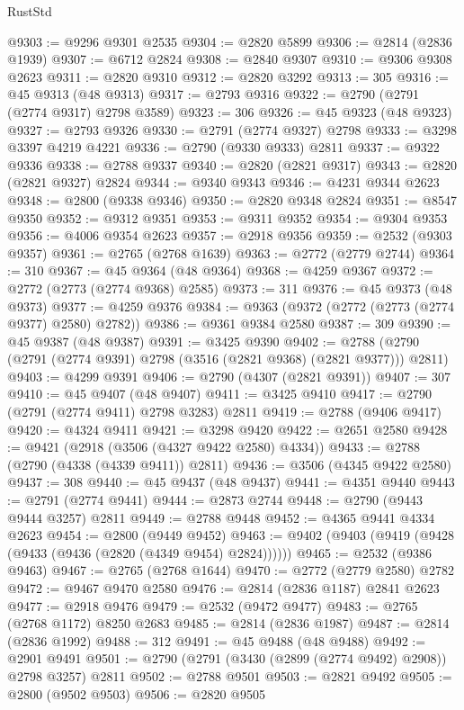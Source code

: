 \begin{lexlean}{RustStd}
\begin{coremodule}
@9303 := @9296 @9301 @2535
@9304 := @2820 @5899
@9306 := @2814 (@2836 @1939)
@9307 := @6712 @2824
@9308 := @2840 @9307
@9310 := @9306 @9308 @2623
@9311 := @2820 @9310
@9312 := @2820 @3292
@9313 := 305
@9316 := @45 @9313 (@48 @9313)
@9317 := @2793 @9316
@9322 := @2790 (@2791 (@2774 @9317) @2798 @3589)
@9323 := 306
@9326 := @45 @9323 (@48 @9323)
@9327 := @2793 @9326
@9330 := @2791 (@2774 @9327) @2798
@9333 := @3298 @3397 @4219 @4221
@9336 := @2790 (@9330 @9333) @2811
@9337 := @9322 @9336
@9338 := @2788 @9337
@9340 := @2820 (@2821 @9317)
@9343 := @2820 (@2821 @9327) @2824
@9344 := @9340 @9343
@9346 := @4231 @9344 @2623
@9348 := @2800 (@9338 @9346)
@9350 := @2820 @9348 @2824
@9351 := @8547 @9350
@9352 := @9312 @9351
@9353 := @9311 @9352
@9354 := @9304 @9353
@9356 := @4006 @9354 @2623
@9357 := @2918 @9356
@9359 := @2532 (@9303 @9357)
@9361 := @2765 (@2768 @1639)
@9363 := @2772 (@2779 @2744)
@9364 := 310
@9367 := @45 @9364 (@48 @9364)
@9368 := @4259 @9367
@9372 := @2772 (@2773 (@2774 @9368) @2585)
@9373 := 311
@9376 := @45 @9373 (@48 @9373)
@9377 := @4259 @9376
@9384 := @9363 (@9372 (@2772 (@2773 (@2774 @9377) @2580) @2782))
@9386 := @9361 @9384 @2580
@9387 := 309
@9390 := @45 @9387 (@48 @9387)
@9391 := @3425 @9390
@9402 := @2788 (@2790 (@2791 (@2774 @9391) @2798 (@3516 (@2821 @9368) (@2821 @9377))) @2811)
@9403 := @4299 @9391
@9406 := @2790 (@4307 (@2821 @9391))
@9407 := 307
@9410 := @45 @9407 (@48 @9407)
@9411 := @3425 @9410
@9417 := @2790 (@2791 (@2774 @9411) @2798 @3283) @2811
@9419 := @2788 (@9406 @9417)
@9420 := @4324 @9411
@9421 := @3298 @9420
@9422 := @2651 @2580
@9428 := @9421 (@2918 (@3506 (@4327 @9422 @2580) @4334))
@9433 := @2788 (@2790 (@4338 (@4339 @9411)) @2811)
@9436 := @3506 (@4345 @9422 @2580)
@9437 := 308
@9440 := @45 @9437 (@48 @9437)
@9441 := @4351 @9440
@9443 := @2791 (@2774 @9441)
@9444 := @2873 @2744
@9448 := @2790 (@9443 @9444 @3257) @2811
@9449 := @2788 @9448
@9452 := @4365 @9441 @4334 @2623
@9454 := @2800 (@9449 @9452)
@9463 := @9402 (@9403 (@9419 (@9428 (@9433 (@9436 (@2820 (@4349 @9454) @2824))))))
@9465 := @2532 (@9386 @9463)
@9467 := @2765 (@2768 @1644)
@9470 := @2772 (@2779 @2580) @2782
@9472 := @9467 @9470 @2580
@9476 := @2814 (@2836 @1187) @2841 @2623
@9477 := @2918 @9476
@9479 := @2532 (@9472 @9477)
@9483 := @2765 (@2768 @1172) @8250 @2683
@9485 := @2814 (@2836 @1987)
@9487 := @2814 (@2836 @1992)
@9488 := 312
@9491 := @45 @9488 (@48 @9488)
@9492 := @2901 @9491
@9501 := @2790 (@2791 (@3430 (@2899 (@2774 @9492) @2908)) @2798 @3257) @2811
@9502 := @2788 @9501
@9503 := @2821 @9492
@9505 := @2800 (@9502 @9503)
@9506 := @2820 @9505

\end{coremodule}
\end{lexlean}
